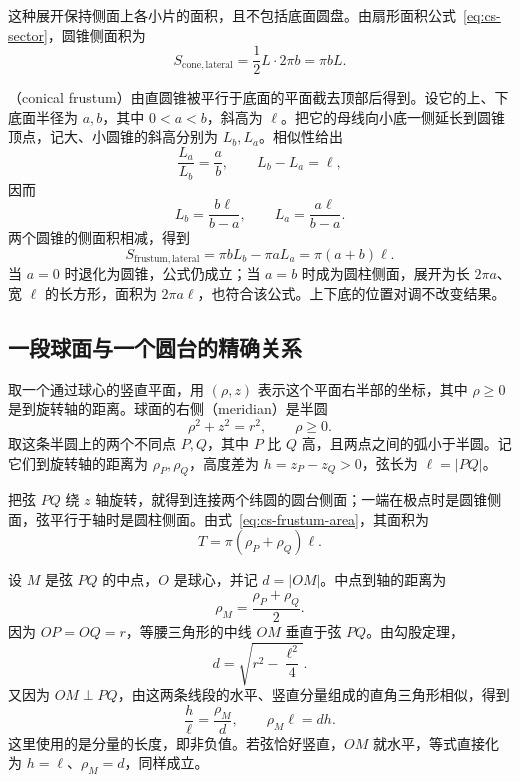 \documentclass[UTF8]{ctexart}
\begin{document}
这种展开保持侧面上各小片的面积，且不包括底面圆盘。由扇形面积公式~\eqref{eq:cs-sector}，圆锥侧面积为
\begin{equation}\label{eq:cs-cone-lateral-area}
  S_{\mathrm{cone,lateral}}=\frac12L\cdot2\pi b=\pi bL.
\end{equation}

（conical frustum）由直圆锥被平行于底面的平面截去顶部后得到。设它的上、下底面半径为 $a,b$，其中 $0<a<b$，斜高为 $\ell$。把它的母线向小底一侧延长到圆锥顶点，记大、小圆锥的斜高分别为 $L_b,L_a$。相似性给出
\[
  \frac{L_a}{L_b}=\frac ab,\qquad L_b-L_a=\ell,
\]
因而
\[
  L_b=\frac{b\ell}{b-a},\qquad L_a=\frac{a\ell}{b-a}.
\]
两个圆锥的侧面积相减，得到
\begin{equation}\label{eq:cs-frustum-area}
  S_{\mathrm{frustum,lateral}}
  =\pi bL_b-\pi aL_a
  =\boxed{\pi(a+b)\ell}.
\end{equation}
当 $a=0$ 时退化为圆锥，公式仍成立；当 $a=b$ 时成为圆柱侧面，展开为长 $2\pi a$、宽 $\ell$ 的长方形，面积为 $2\pi a\ell$，也符合该公式。上下底的位置对调不改变结果。

\subsection{一段球面与一个圆台的精确关系}
\label{subsec:cs-zone-frustum}

取一个通过球心的竖直平面，用 $(\rho,z)$ 表示这个平面右半部的坐标，其中 $\rho\geq0$ 是到旋转轴的距离。球面的右侧（meridian）是半圆
\[
  \rho^2+z^2=r^2,\qquad \rho\geq0.
\]
取这条半圆上的两个不同点 $P,Q$，其中 $P$ 比 $Q$ 高，且两点之间的弧小于半圆。记它们到旋转轴的距离为 $\rho_P,\rho_Q$，高度差为 $h=z_P-z_Q>0$，弦长为 $\ell=|PQ|$。

把弦 $PQ$ 绕 $z$ 轴旋转，就得到连接两个纬圆的圆台侧面；一端在极点时是圆锥侧面，弦平行于轴时是圆柱侧面。由式~\eqref{eq:cs-frustum-area}，其面积为
\[
  T=\pi(\rho_P+\rho_Q)\ell.
\]

设 $M$ 是弦 $PQ$ 的中点，$O$ 是球心，并记 $d=|OM|$。中点到轴的距离为
\[
  \rho_M=\frac{\rho_P+\rho_Q}{2}.
\]
因为 $OP=OQ=r$，等腰三角形的中线 $OM$ 垂直于弦 $PQ$。由勾股定理，
\begin{equation}\label{eq:cs-chord-distance}
  d=\sqrt{r^2-\frac{\ell^2}{4}}.
\end{equation}
又因为 $OM\perp PQ$，由这两条线段的水平、竖直分量组成的直角三角形相似，得到
\begin{equation}\label{eq:cs-chord-height}
  \frac{h}{\ell}=\frac{\rho_M}{d},\qquad
  \rho_M\ell=dh.
\end{equation}
这里使用的是分量的长度，即非负值。若弦恰好竖直，$OM$ 就水平，等式直接化为 $h=\ell$、$\rho_M=d$，同样成立。
\end{document}

